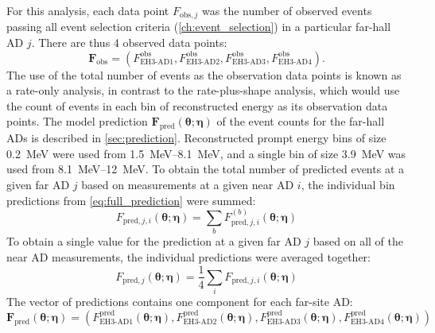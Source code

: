For this analysis, each data point $F_{\text{obs},j}$
was the number of observed events passing all event selection criteria
(\cref{ch:event_selection})
in a particular far-hall AD $j$.
There are thus 4 observed data points:
\begin{equation}
    \mathbf{F}_{\text{obs}} =
    (F^{\text{obs}}_{\text{EH3-AD1}},
    F^{\text{obs}}_{\text{EH3-AD2}},
    F^{\text{obs}}_{\text{EH3-AD3}},
    F^{\text{obs}}_{\text{EH3-AD4}}).
\end{equation}
The use of the total number of events as the observation data points
is known as a rate-only analysis,
in contrast to the rate-plus-shape analysis, which would use
the count of events in each bin of reconstructed energy
as its observation data points.
The model prediction
$\mathbf{F}_{\text{pred}}(\boldsymbol{\theta};\boldsymbol{\eta})$
of the event counts for the far-hall ADs
is described in \cref{sec:prediction}.
Reconstructed prompt energy bins of size \SI{0.2}{\MeV} were used from \SIrange{1.5}{8.1}{\MeV},
and a single bin of size \SI{3.9}{\MeV} was used from \SIrange{8.1}{12}{\MeV}.
To obtain the total number of predicted events at a given far AD $j$
based on measurements at a given near AD $i$,
the individual bin predictions from \cref{eq:full_prediction} were summed:
\begin{equation}\label{eq:hybrid_rate_shape}
    F_{\text{pred},j,i}(\boldsymbol{\theta};\boldsymbol{\eta}) =
    \sum_b F_{\text{pred},j,i}^{(b)}(\boldsymbol{\theta};\boldsymbol{\eta})
\end{equation}
To obtain a single value for the prediction at a given far AD $j$
based on all of the near AD measurements,
the individual predictions were averaged together:
\begin{equation}\label{eq:average_near}
    F_{\text{pred},j}(\boldsymbol{\theta};\boldsymbol{\eta}) =
    \frac{1}{4} \sum_i
    F_{\text{pred},j,i}(\boldsymbol{\theta};\boldsymbol{\eta})
\end{equation}
The vector of predictions contains one component for each far-site AD:
\begin{equation}\label{eq:f_pred_vector}
    \mathbf{F}_\text{pred}(\boldsymbol{\theta};\boldsymbol{\eta}) =
    (
    F^{\text{pred}}_{\text{EH3-AD1}}(\boldsymbol{\theta};\boldsymbol{\eta}),
    F^{\text{pred}}_{\text{EH3-AD2}}(\boldsymbol{\theta};\boldsymbol{\eta}),
    F^{\text{pred}}_{\text{EH3-AD3}}(\boldsymbol{\theta};\boldsymbol{\eta}),
    F^{\text{pred}}_{\text{EH3-AD4}}(\boldsymbol{\theta};\boldsymbol{\eta})
    )
\end{equation}
